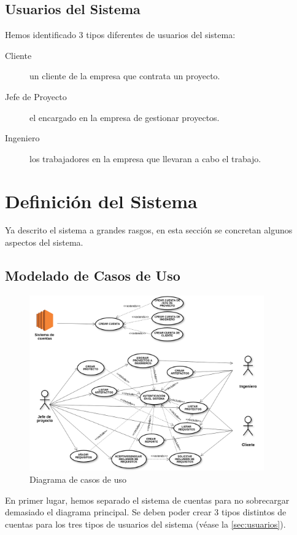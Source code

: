 \documentclass[a4paper, spanish]{article}
\begin{document}
\subsection{Usuarios del Sistema}\label{sec:usuarios}
Hemos identificado 3 tipos diferentes de usuarios del sistema:
\begin{description}
  \item [Cliente] un cliente de la empresa que contrata un proyecto.
  \item [Jefe de Proyecto] el encargado en la empresa de gestionar proyectos.
  \item [Ingeniero] los trabajadores en la empresa que llevaran a cabo el trabajo.
\end{description}

\section{Definición del Sistema}
Ya descrito el sistema a grandes rasgos, en esta sección se concretan algunos
aspectos del sistema.

\subsection{Modelado de Casos de Uso}
\begin{figure}[h!]
\centering
\includegraphics[width=0.9\textwidth]{diagramas/diagrama-casos-uso.png}
\caption{Diagrama de casos de uso}\label{fig:casosdeuso}
\end{figure}
En primer lugar, hemos separado el sistema de cuentas para no sobrecargar
demasiado el diagrama principal.
Se deben poder crear 3 tipos distintos de cuentas para los tres tipos de usuarios 
del sistema (véase la \autoref{sec:usuarios}).
\end{document}
